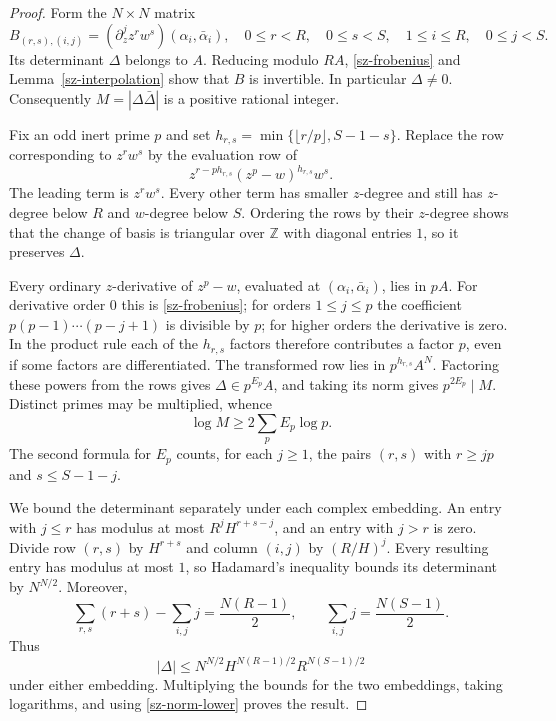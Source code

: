 \begin{proof}
Form the $N\times N$ matrix
\[
 B_{(r,s),(i,j)}=(\partial_z^j z^rw^s)(\alpha_i,\bar\alpha_i),
 \quad 0\le r<R,\quad 0\le s<S,\quad1\le i\le R,\quad0\le j<S.
\]
Its determinant $\Delta$ belongs to $A$. Reducing modulo $RA$,
\eqref{sz-frobenius} and Lemma~\ref{sz-interpolation} show that $B$ is
invertible. In particular $\Delta\ne0$. Consequently
$M=|\Delta\bar\Delta|$ is a positive rational integer.

Fix an odd inert prime $p$ and set
$h_{r,s}=\min\{\lfloor r/p\rfloor,S-1-s\}$. Replace the row
corresponding to $z^rw^s$ by the evaluation row of
\[
 z^{r-ph_{r,s}}(z^p-w)^{h_{r,s}}w^s.
\]
The leading term is $z^rw^s$. Every other term has smaller $z$-degree
and still has $z$-degree below $R$ and $w$-degree below $S$.
Ordering the rows by their $z$-degree shows that the change of basis is
triangular over $\mathbb Z$ with diagonal entries $1$, so it preserves
$\Delta$.

Every ordinary $z$-derivative of $z^p-w$, evaluated at
$(\alpha_i,\bar\alpha_i)$, lies in $pA$. For derivative order $0$ this
is \eqref{sz-frobenius}; for orders $1\le j\le p$ the coefficient
$p(p-1)\cdots(p-j+1)$ is divisible by $p$; for higher orders the derivative
is zero. In the product rule each of the $h_{r,s}$ factors therefore
contributes a factor $p$, even if some factors are differentiated.
The transformed row lies in $p^{h_{r,s}}A^N$. Factoring these powers
from the rows gives $\Delta\in p^{E_p}A$, and taking its norm gives
$p^{2E_p}\mid M$. Distinct primes may be multiplied, whence
\begin{equation}\label{sz-norm-lower}
 \log M\ge2\sum_p E_p\log p.
\end{equation}
The second formula for $E_p$ counts, for each $j\ge1$, the pairs
$(r,s)$ with $r\ge jp$ and $s\le S-1-j$.

We bound the determinant separately under each complex embedding.
An entry with $j\le r$ has modulus at most
$R^jH^{r+s-j}$, and an entry with $j>r$ is zero. Divide row $(r,s)$
by $H^{r+s}$ and column $(i,j)$ by $(R/H)^j$. Every resulting entry
has modulus at most $1$, so Hadamard's inequality bounds its determinant
by $N^{N/2}$. Moreover,
\[
 \sum_{r,s}(r+s)-\sum_{i,j}j=\frac{N(R-1)}2,
 \qquad \sum_{i,j}j=\frac{N(S-1)}2.
\]
Thus
\[
 |\Delta|\le N^{N/2}H^{N(R-1)/2}R^{N(S-1)/2}
\]
under either embedding. Multiplying the bounds for the two embeddings,
taking logarithms, and using \eqref{sz-norm-lower} proves the result.
\end{proof}

